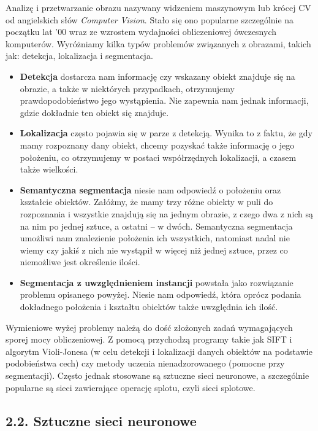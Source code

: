 \documentclass{article}
\begin{document}
Analizę i przetwarzanie obrazu nazywany widzeniem maszynowym lub krócej CV od angielskich słów \emph{Computer Vision}. Stało się ono popularne szczególnie na początku lat '00 wraz ze wzrostem wydajności obliczeniowej ówczesnych komputerów. Wyróżniamy kilka typów problemów związanych z obrazami, takich jak: detekcja, lokalizacja i segmentacja.

\begin{itemize}
\item \textbf{Detekcja} dostarcza nam informację czy wskazany obiekt znajduje się na obrazie,
a także w niektórych przypadkach, otrzymujemy prawdopodobieństwo jego wystąpienia. Nie zapewnia nam jednak informacji, gdzie dokładnie ten obiekt się znajduje.

\item \textbf{Lokalizacja} często pojawia się w parze z detekcją. Wynika to z faktu, że gdy mamy rozpoznany dany obiekt, chcemy pozyskać także informację o jego położeniu, co otrzymujemy w postaci współrzędnych lokalizacji, a czasem także wielkości.

\item \textbf{Semantyczna segmentacja} niesie nam odpowiedź o położeniu oraz kształcie obiektów. Załóżmy, że mamy trzy różne obiekty w puli do rozpoznania i wszystkie znajdują się na jednym obrazie, z czego dwa z nich są na nim po jednej sztuce, a ostatni – w dwóch. Semantyczna segmentacja umożliwi nam znalezienie położenia ich wszystkich, natomiast nadal nie wiemy czy jakiś z nich nie wystąpił w więcej niż jednej sztuce, przez co niemożliwe jest określenie ilości.

\item \textbf{Segmentacja z uwzględnieniem instancji} powstała jako rozwiązanie problemu opisanego powyżej. Niesie nam odpowiedź, która oprócz podania dokładnego położenia i kształtu obiektów także uwzględnia ich ilość.
\end{itemize} 

Wymieniowe wyżej problemy należą do dość złożonych zadań wymagających sporej mocy obliczeniowej. Z pomocą przychodzą programy takie jak SIFT i algorytm Violi-Jonesa (w celu detekcji i lokalizacji danych obiektów na podstawie podobieństwa cech) czy metody uczenia nienadzorowanego (pomocne przy segmentacji). Często jednak stosowane są sztuczne sieci neuronowe, a szczególnie popularne są sieci zawierające operację splotu, czyli sieci splotowe.

\subsection*{\LARGE{2.2. Sztuczne sieci neuronowe}} 
\end{document}

